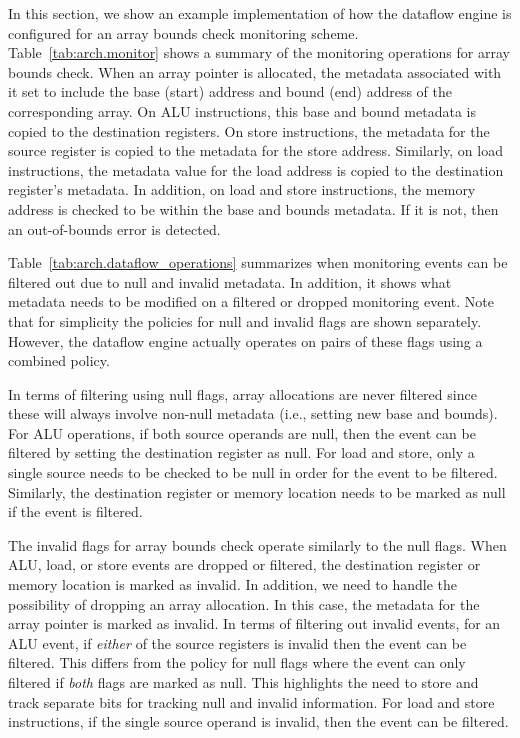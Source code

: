In this section, we show an example implementation of how the dataflow engine
is configured for an array bounds check monitoring scheme.
Table~\ref{tab:arch.monitor} shows a summary of the monitoring operations for
array bounds check.  When an array pointer is allocated, the metadata
associated with it set to include the base (start) address and bound (end)
address of the corresponding array. On ALU instructions, this base and bound
metadata is copied to the destination registers. On store instructions, the
metadata for the source register is copied to the metadata for the store
address. Similarly, on load instructions, the metadata value for the load
address is copied to the destination register's metadata. In addition, on load
and store instructions, the memory address is checked to be within the base and
bounds metadata. If it is not, then an out-of-bounds error is detected. 

Table~\ref{tab:arch.dataflow_operations} summarizes when monitoring events
can be filtered out due to null and invalid metadata. In addition, it shows
what metadata needs to be modified on a filtered or dropped monitoring event.
Note that for simplicity the policies for null and invalid flags are shown
separately. However, the dataflow engine actually operates on pairs of these
flags using a combined policy.

In terms of filtering using null flags, array allocations are never filtered
since these will always involve non-null metadata (i.e., setting new base and
bounds). For ALU operations, if both source operands are null, then the event
can be filtered by setting the destination register as null. For load and
store, only a single source needs to be checked to be null in order for the
event to be filtered. Similarly, the destination register or memory location
needs to be marked as null if the event is filtered.

The invalid flags for array bounds check operate similarly to the null flags.
When ALU, load, or store events are dropped or filtered, the destination
register or memory location is marked as invalid. In addition, we need to
handle the possibility of dropping an array allocation. In this case, the metadata for the array
pointer is marked as invalid. In terms of filtering out invalid events, for an
ALU event, if \emph{either} of the source registers is invalid then the event can be
filtered. This differs from the policy for null flags where the event can only
filtered if \emph{both} flags are marked as null. This highlights the need to
store and track separate bits for tracking null and invalid information. For
load and store instructions, if the single source operand is invalid, then the
event can be filtered.

